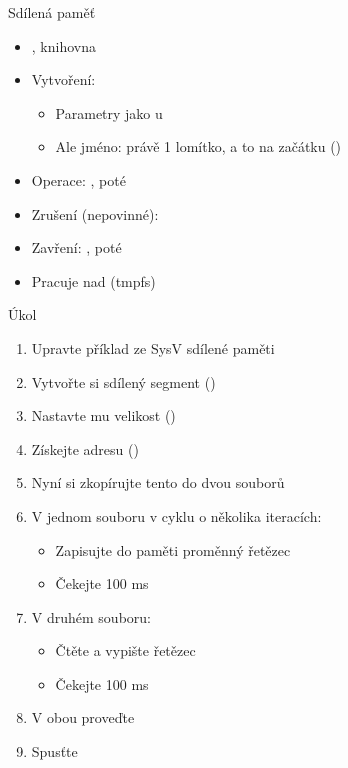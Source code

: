 \begin{frame}{Sdílená paměť}

  \begin{itemize}
    \item {}, knihovna 
    \item Vytvoření: 
    \begin{itemize}
      \item Parametry jako u 
      \item Ale jméno: právě 1 lomítko, a to na začátku ()
    \end{itemize}

    \pause

    \item Operace: , poté 

    \item Zrušení (nepovinné): 
    \item Zavření: , poté 

    \pause

    \item Pracuje nad  (tmpfs)
  \end{itemize}

\end{frame}

\begin{frame}{Úkol}

  \begin{enumerate}
    \item Upravte příklad ze SysV sdílené paměti
    \item Vytvořte si sdílený segment ()
    \item Nastavte mu velikost ()
    \item Získejte adresu ()
    \item Nyní si zkopírujte tento  do dvou souborů
    \item V jednom souboru v cyklu o několika iteracích:
    \begin{itemize}
      \item Zapisujte do paměti proměnný řetězec
      \item Čekejte 100 ms
    \end{itemize}

    \item V druhém souboru:
    \begin{itemize}
      \item Čtěte a vypište řetězec
      \item Čekejte 100 ms
    \end{itemize}

    \item V obou proveďte 
    \item Spusťte
  \end{enumerate}

\end{frame}

